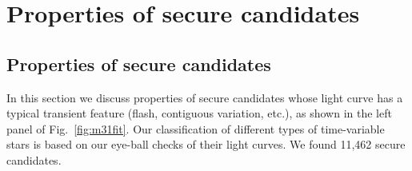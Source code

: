\documentclass[iop, apj]{emulateapj}
\newcommand{\?}{\stackrel{?}{=}}
\begin{document}

\section{Properties of secure candidates}
\label{sec:obs2}

\subsection{Properties of secure candidates}
\label{sec:candidates}
In this section we discuss properties of secure candidates whose light curve has a typical transient feature (flash, contiguous variation, etc.), as shown in the left panel of Fig.~\ref{fig:m31fit}. 
Our classification of different types of time-variable stars is based on our eye-ball checks of their light curves. We found 11,462 secure candidates. 
\end{document}
